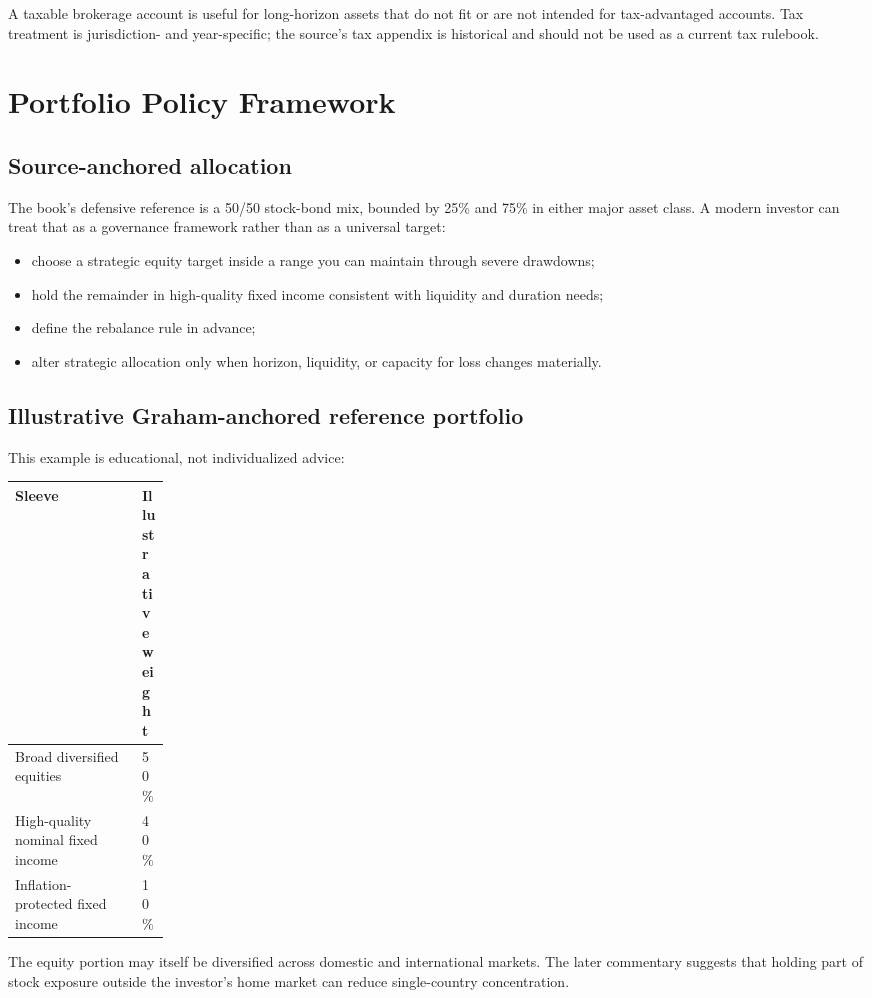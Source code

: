 \documentclass[11pt]{article}
\begin{document}
A taxable brokerage account is useful for long-horizon assets that do not fit or are not intended for tax-advantaged accounts. Tax treatment is jurisdiction- and year-specific; the source's tax appendix is historical and should not be used as a current tax rulebook.

\section{Portfolio Policy Framework}
\subsection{Source-anchored allocation}
The book's defensive reference is a 50/50 stock-bond mix, bounded by 25\% and 75\% in either major asset class. A modern investor can treat that as a governance framework rather than as a universal target:
\begin{itemize}
\item choose a strategic equity target inside a range you can maintain through severe drawdowns;
\item hold the remainder in high-quality fixed income consistent with liquidity and duration needs;
\item define the rebalance rule in advance;
\item alter strategic allocation only when horizon, liquidity, or capacity for loss changes materially.
\end{itemize}

\subsection{Illustrative Graham-anchored reference portfolio}
This example is educational, not individualized advice:
\begin{center}
\begin{tabularx}{0.84\linewidth}{@{}Y C{0.18\linewidth}@{}}
\toprule
\textbf{Sleeve} & \textbf{Illustrative weight}\\
\midrule
Broad diversified equities & 50\%\\
High-quality nominal fixed income & 40\%\\
Inflation-protected fixed income & 10\%\\
\bottomrule
\end{tabularx}
\end{center}
The equity portion may itself be diversified across domestic and international markets. The later commentary suggests that holding part of stock exposure outside the investor's home market can reduce single-country concentration.
\end{document}
